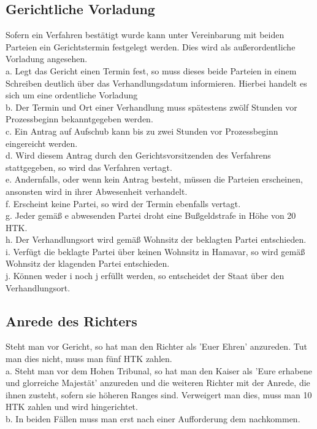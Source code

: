 \documentclass{article}
\begin{document}
\subsection{Gerichtliche Vorladung}
Sofern ein Verfahren bestätigt wurde kann unter Vereinbarung mit beiden Parteien ein Gerichtstermin festgelegt werden. Dies wird als außerordentliche Vorladung angesehen.\\
a. Legt das Gericht einen Termin fest, so muss dieses beide Parteien in einem Schreiben deutlich über das Verhandlungsdatum informieren. Hierbei handelt es sich um eine ordentliche Vorladung\\
b. Der Termin und Ort einer Verhandlung muss spätestens zwölf Stunden vor Prozessbeginn bekanntgegeben werden.\\
c. Ein Antrag auf Aufschub kann bis zu zwei Stunden vor Prozessbeginn eingereicht werden.\\
d. Wird diesem Antrag durch den Gerichtsvorsitzenden des Verfahrens stattgegeben, so wird das Verfahren vertagt.\\
e. Andernfalls, oder wenn kein Antrag besteht, müssen die Parteien erscheinen, ansonsten wird in ihrer Abwesenheit verhandelt.\\
f. Erscheint keine Partei, so wird der Termin ebenfalls vertagt.\\
g. Jeder gemäß e abwesenden Partei droht eine Bußgeldstrafe in Höhe von 20 HTK.\\
h. Der Verhandlungsort wird gemäß Wohnsitz der beklagten Partei entschieden.\\
i. Verfügt die beklagte Partei über keinen Wohnsitz in Hamavar, so wird gemäß Wohnsitz der klagenden Partei entschieden.\\
j. Können weder i noch j erfüllt werden, so entscheidet der Staat über den Verhandlungsort.

\subsection{Anrede des Richters}
Steht man vor Gericht, so hat man den Richter als 'Euer Ehren' anzureden. Tut man dies nicht, muss man fünf HTK zahlen.\\
a. Steht man vor dem Hohen Tribunal, so hat man den Kaiser als 'Eure erhabene und glorreiche Majestät' anzureden und die weiteren Richter mit der Anrede, die ihnen zusteht, sofern sie höheren Ranges sind. Verweigert man dies, muss man 10 HTK zahlen und wird hingerichtet.\\
b. In beiden Fällen muss man erst nach einer Aufforderung dem nachkommen.
\end{document}
